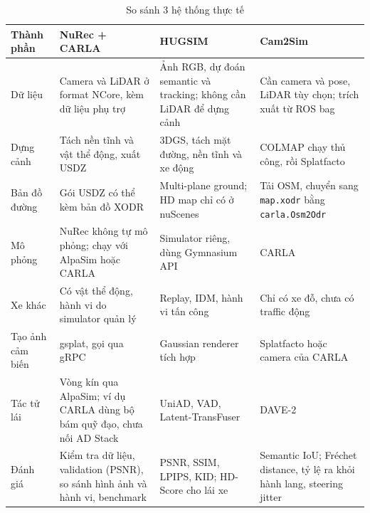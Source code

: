 \begin{table}[H]
  \centering
  \small
  \caption{So sánh 3 hệ thống thực tế}
  \begin{tabularx}{\linewidth}{>{\raggedright\arraybackslash}p{2.2cm} >{\raggedright\arraybackslash}X >{\raggedright\arraybackslash}X >{\raggedright\arraybackslash}X}
    \toprule
    \textbf{Thành phần} & \textbf{NuRec + CARLA} & \textbf{HUGSIM} & \textbf{Cam2Sim} \\
    \midrule
    Dữ liệu & Camera và LiDAR ở format NCore, kèm dữ liệu phụ trợ & Ảnh RGB, dự đoán semantic và tracking; không cần LiDAR để dựng cảnh & Cần camera và pose, LiDAR tùy chọn; trích xuất từ ROS bag \\
    \addlinespace
    Dựng cảnh & Tách nền tĩnh và vật thể động, xuất USDZ & 3DGS, tách mặt đường, nền tĩnh và xe động & COLMAP chạy thủ công, rồi Splatfacto \\
    \addlinespace
    Bản đồ đường & Gói USDZ có thể kèm bản đồ XODR & Multi-plane ground; HD map chỉ có ở nuScenes & Tải OSM, chuyển sang \texttt{map.xodr} bằng \texttt{carla.\allowbreak Osm2Odr} \\
    \addlinespace
    Mô phỏng & NuRec không tự mô phỏng; chạy với AlpaSim hoặc CARLA & Simulator riêng, dùng Gymnasium API & CARLA \\
    \addlinespace
    Xe khác & Có vật thể động, hành vi do simulator quản lý & Replay, IDM, hành vi tấn công & Chỉ có xe đỗ, chưa có traffic động \\
    \addlinespace
    Tạo ảnh cảm biến & gsplat, gọi qua gRPC & Gaussian renderer tích hợp & Splatfacto hoặc camera của CARLA \\
    \addlinespace
    Tác tử lái & Vòng kín qua AlpaSim; ví dụ CARLA dùng bộ bám quỹ đạo, chưa nối AD Stack & UniAD, VAD, Latent-TransFuser & DAVE-2 \\
    \addlinespace
    Đánh giá & Kiểm tra dữ liệu, validation (PSNR), so sánh hình ảnh và hành vi, benchmark & PSNR, SSIM, LPIPS, KID; HD-Score cho lái xe & Semantic IoU; Fréchet distance, tỷ lệ ra khỏi hành lang, steering jitter \\
    \bottomrule
  \end{tabularx}
\end{table}

